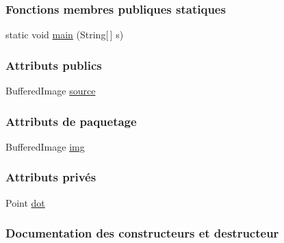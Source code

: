 \subsubsection*{Fonctions membres publiques statiques}
\begin{DoxyCompactItemize}
\item 
static void \hyperlink{classTestSushi_1_1src_1_1Pictures_1_1FindPicture_a7ebd0b729a5146cfdc91c4b367c817af}{main} (String\mbox{[}$\,$\mbox{]} s)
\end{DoxyCompactItemize}
\subsubsection*{Attributs publics}
\begin{DoxyCompactItemize}
\item 
Buffered\+Image \hyperlink{classTestSushi_1_1src_1_1Pictures_1_1FindPicture_a8f97c27187060e065669476a0774be89}{source}
\end{DoxyCompactItemize}
\subsubsection*{Attributs de paquetage}
\begin{DoxyCompactItemize}
\item 
Buffered\+Image \hyperlink{classTestSushi_1_1src_1_1Pictures_1_1FindPicture_a2efdf9b4cf94ca02ddc955f9a205c090}{img}
\end{DoxyCompactItemize}
\subsubsection*{Attributs privés}
\begin{DoxyCompactItemize}
\item 
Point \hyperlink{classTestSushi_1_1src_1_1Pictures_1_1FindPicture_a11d5ad9f9638c38bdedea6033fef44bf}{dot}
\end{DoxyCompactItemize}


\subsubsection{Documentation des constructeurs et destructeur}
\hypertarget{classTestSushi_1_1src_1_1Pictures_1_1FindPicture_abb6768894f5395ad3b39c53f11cb330f}{}
